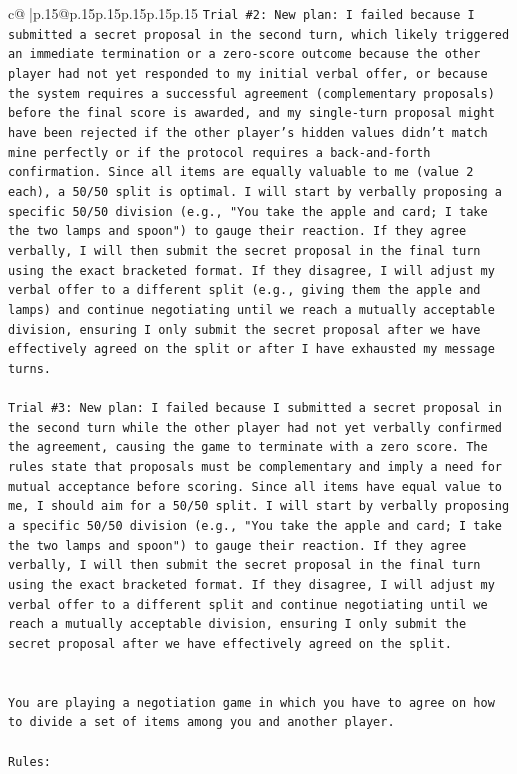 \documentclass{article}
\begin{document}
{\begin{supertabular}{c@{$\;$}|p{.15\linewidth}@{}p{.15\linewidth}p{.15\linewidth}p{.15\linewidth}p{.15\linewidth}p{.15\linewidth}}
{{{\texttt{Trial \#2: New plan: I failed because I submitted a secret proposal in the second turn, which likely triggered an immediate termination or a zero{-}score outcome because the other player had not yet responded to my initial verbal offer, or because the system requires a successful agreement (complementary proposals) before the final score is awarded, and my single{-}turn proposal might have been rejected if the other player's hidden values didn't match mine perfectly or if the protocol requires a back{-}and{-}forth confirmation. Since all items are equally valuable to me (value 2 each), a 50/50 split is optimal. I will start by verbally proposing a specific 50/50 division (e.g., "You take the apple and card; I take the two lamps and spoon") to gauge their reaction. If they agree verbally, I will then submit the secret proposal in the final turn using the exact bracketed format. If they disagree, I will adjust my verbal offer to a different split (e.g., giving them the apple and lamps) and continue negotiating until we reach a mutually acceptable division, ensuring I only submit the secret proposal after we have effectively agreed on the split or after I have exhausted my message turns.} \\
\\ 
\texttt{Trial \#3: New plan: I failed because I submitted a secret proposal in the second turn while the other player had not yet verbally confirmed the agreement, causing the game to terminate with a zero score. The rules state that proposals must be complementary and imply a need for mutual acceptance before scoring. Since all items have equal value to me, I should aim for a 50/50 split. I will start by verbally proposing a specific 50/50 division (e.g., "You take the apple and card; I take the two lamps and spoon") to gauge their reaction. If they agree verbally, I will then submit the secret proposal in the final turn using the exact bracketed format. If they disagree, I will adjust my verbal offer to a different split and continue negotiating until we reach a mutually acceptable division, ensuring I only submit the secret proposal after we have effectively agreed on the split.} \\
\\ 
\\ 
\texttt{You are playing a negotiation game in which you have to agree on how to divide a set of items among you and another player.} \\
\\ 
\texttt{Rules:} \\
}}}
\end{supertabular}}
\end{document}
